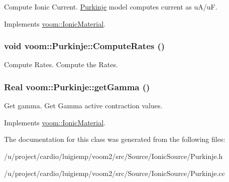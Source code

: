 Compute Ionic Current. \hyperlink{classvoom_1_1_purkinje}{Purkinje} model computes current as uA/uF. 

Implements \hyperlink{classvoom_1_1_ionic_material_a1b95cf90af115374b428f2e5ece571cb}{voom::IonicMaterial}.\hypertarget{classvoom_1_1_purkinje_aaa3d5d9632eaca5099d0568227faa958}{
\subsubsection[{ComputeRates}]{\setlength{\rightskip}{0pt plus 5cm}void voom::Purkinje::ComputeRates ()}}
\label{classvoom_1_1_purkinje_aaa3d5d9632eaca5099d0568227faa958}


Compute Rates. Compute the Rates. \hypertarget{classvoom_1_1_purkinje_a337aa8f4b1ea0bd6f08635950cc39a2d}{
\subsubsection[{getGamma}]{\setlength{\rightskip}{0pt plus 5cm}Real voom::Purkinje::getGamma ()}}
\label{classvoom_1_1_purkinje_a337aa8f4b1ea0bd6f08635950cc39a2d}


Get gamma. Get Gamma active contraction values. 

Implements \hyperlink{classvoom_1_1_ionic_material_a98f1fa5bc5fa9ff6abfcd302111f8eac}{voom::IonicMaterial}.

The documentation for this class was generated from the following files:\begin{DoxyCompactItemize}
\item 
/u/project/cardio/luigiemp/voom2/src/Source/IonicSource/Purkinje.h\item 
/u/project/cardio/luigiemp/voom2/src/Source/IonicSource/Purkinje.cc\end{DoxyCompactItemize}
